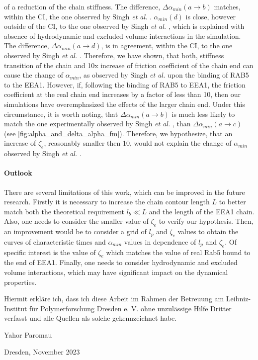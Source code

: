 \documentclass[
    paper=A4,pagesize=automedia,fontsize=12pt,
    BCOR=15mm,DIV=22,
    twoside,headinclude,footinclude=false,
    fleqn,             %
    bibliography=totocnumbered,          %
    listof=totoc,                %
    listof=flat,                 %
    cleardoublepage=empty      %
    numbers=endperiod
]{scrartcl}
\begin{document}
of a reduction of the chain stiffness.
The difference, $\Delta \alpha_{min}(a \rightarrow b)$ 
matches, within the CI, the one observed by Singh \emph{et al.} \cite{Singh:2022}.
$\alpha_{min}(d)$ is close, however outside of the CI, 
to the one observed by Singh \emph{et al.} \cite{Singh:2022}, 
which is explained with absence of hydrodynamic
and excluded volume interactions in the simulation. 
The difference, $\Delta \alpha_{min}(a \rightarrow d)$,
is in agreement, within the CI, to the one observed by Singh \emph{et al.} \cite{Singh:2022}.
Therefore, we have shown, that both, stiffness transition of the chain
and 10x increase of friction coefficient of the chain end can cause the change
of $\alpha_{min}$, as observed by Singh \emph{et al.} \cite{Singh:2022} 
upon the binding of RAB5 to the EEA1. However, if, following the binding of RAB5 to EEA1, 
the friction coefficient at the real chain end increases by a factor of less than 10, then   
our simulations have overemphasized the effects of the larger chain end. 
Under this circumstance, it is worth noting, that 
$\Delta \alpha_{min} (a \rightarrow b)$ is much less likely 
to match the one experimentally observed by Singh \emph{et al.} \cite{Singh:2022},  
than $\Delta \alpha_{min} (a \rightarrow c)$ (see \autoref{fig:alpha_and_delta_alpha_fm}). 
Therefore, we hypothesize, that an
increase of $\zeta_e$, reasonably smaller then 10, 
would not explain the change of $\alpha_{min}$ observed by
Singh \emph{et al.} \cite{Singh:2022}.



\paragraph{Outlook}
There are several limitations of this work, which can be improved in the future research.
Firstly it is necessary to increase the chain contour length $L$ to better match both the
theoretical requirement $l_b \ll L$ and the length of the EEA1 chain. Also, one needs to
consider the smaller value of $\zeta_e$ to verify our hypothesis. Then, an improvement 
would be to consider a grid of $l_p$ and $\zeta_e$ values to obtain the 
curves of characteristic times and $\alpha_{min}$ values in dependence of 
$l_p$ and $\zeta_e$. Of specific interest is the value of $\zeta_e$ which matches 
the value of real Rab5 bound to the end of EEA1. Finally, one needs to
consider hydrodynamic and excluded volume interactions, 
which may have significant impact on the dynamical properties.  


\clearpage
\thispagestyle{empty}
\vspace*{1.5em}

Hiermit erkläre ich, dass ich diese Arbeit im Rahmen der Betreuung am Leibniz-Institut für Polymerforschung Dresden e. V.
ohne unzulässige Hilfe Dritter verfasst und alle Quellen als solche gekennzeichnet habe.

\vspace*{45em}

Yahor Paromau \par
Dresden, November 2023



\end{document}
